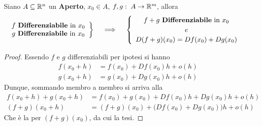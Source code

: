 \begin{proposition}
	\label{prop:diff_somma_funz}
	Siano $A \subseteq \mathbb{R}^n$ un \textbf{Aperto}, $x_0 \in A$, $f, g:\; A \to \mathbb{R}^m$, allora
	\[
		\left.
		\begin{array}{c}
			f \text{ \textbf{Differenziabile} in } x_0\\
			g \text{ \textbf{Differenziabile} in } x_0
		\end{array}
		\right\}
		\quad \implies \quad
		\begin{cases}
			\begin{array}{c}
				f + g \text{ \textbf{Differenziabile} in } x_0\\
				e\\
				D(f + g)(x_0) = Df(x_0) + Dg(x_0)
			\end{array}
		\end{cases}
	\]
	\begin{proof}
		Essendo $f$ e $g$ differenziabili per ipotesi si hanno
		\begin{align*}
			f(x_0 + h) &= f(x_0) + Df(x_0)h + o(h)\\
			g(x_0 + h) &= g(x_0) + Dg(x_0)h + o(h)
		\end{align*}
		Dunque, sommando membro a membro si arriva alla
		\begin{align*}
			f(x_0 + h) + g(x_0 + h) &= f(x_0) + g(x_0) + Df(x_0)h + Dg(x_0)h + o(h)\\
			(f + g)(x_0 + h) &= (f + g)(x_0) + \bigl( Df(x_0) + Dg(x_0) \bigr) h + o(h)
		\end{align*}
		Che è la  per $(f + g)(x_0)$, da cui la tesi.
	\end{proof}
\end{proposition}

